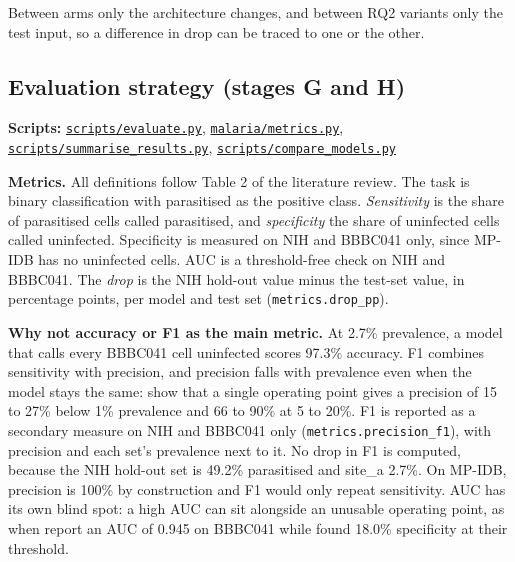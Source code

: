 \documentclass[11pt,a4paper]{article}
\begin{document}
Between arms only the architecture changes, and between RQ2 variants only the test input, so a difference in drop can be traced to one or the other.

\subsection{Evaluation strategy (stages G and H)}

\textbf{Scripts:} \href{https://github.com/noahtjonsk/malaria-cross-dataset/blob/main/scripts/evaluate.py}{\texttt{scripts/\allowbreak{}evaluate.\allowbreak{}py}}, \href{https://github.com/noahtjonsk/malaria-cross-dataset/blob/main/malaria/metrics.py}{\texttt{malaria/\allowbreak{}metrics.\allowbreak{}py}}, \href{https://github.com/noahtjonsk/malaria-cross-dataset/blob/main/scripts/summarise_results.py}{\texttt{scripts/\allowbreak{}summarise\_\allowbreak{}results.\allowbreak{}py}}, \href{https://github.com/noahtjonsk/malaria-cross-dataset/blob/main/scripts/compare_models.py}{\texttt{scripts/\allowbreak{}compare\_\allowbreak{}models.\allowbreak{}py}}

\textbf{Metrics.} All definitions follow Table 2 of the literature review. The task is binary classification with parasitised as the positive class. \emph{Sensitivity} is the share of parasitised cells called parasitised, and \emph{specificity} the share of uninfected cells called uninfected. Specificity is measured on NIH and BBBC041 only, since MP-IDB has no uninfected cells. AUC is a threshold-free check on NIH and BBBC041. The \emph{drop} is the NIH hold-out value minus the test-set value, in percentage points, per model and test set (\texttt{metrics.\allowbreak{}drop\_\allowbreak{}pp}).

\textbf{Why not accuracy or F1 as the main metric.} At 2.7\% prevalence, a model that calls every BBBC041 cell uninfected scores 97.3\% accuracy. F1 combines sensitivity with precision, and precision falls with prevalence even when the model stays the same: \citet{hou2026} show that a single operating point gives a precision of 15 to 27\% below 1\% prevalence and 66 to 90\% at 5 to 20\%. F1 is reported as a secondary measure on NIH and BBBC041 only (\texttt{metrics.\allowbreak{}precision\_\allowbreak{}f1}), with precision and each set's prevalence next to it. No drop in F1 is computed, because the NIH hold-out set is 49.2\% parasitised and site\_\allowbreak{}a 2.7\%. On MP-IDB, precision is 100\% by construction and F1 would only repeat sensitivity. AUC has its own blind spot: a high AUC can sit alongside an unusable operating point, as when \citet{zhao2020} report an AUC of 0.945 on BBBC041 while \citet{hou2026} found 18.0\% specificity at their threshold.
\end{document}
